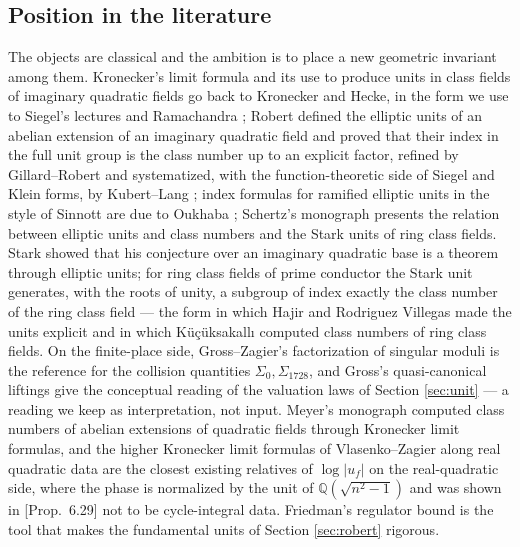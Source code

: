 \documentclass[11pt]{amsart}
\numberwithin{equation}{section}
\theoremstyle{plain}
\theoremstyle{definition}
\theoremstyle{remark}
\newcommand{\Q}{\mathbb{Q}}
\newcommand{\PaperI}{\cite{SchmidtI}}
\begin{document}
\subsection*{Position in the literature}
The objects are classical and the ambition is to place a new geometric
invariant among them.  Kronecker's limit formula and its use to produce
units in class fields of imaginary quadratic fields go back to Kronecker
and Hecke, in the form we use to Siegel's lectures \cite{Siegel1961} and
Ramachandra \cite{Ramachandra1964}; Robert \cite{Robert1973} defined the
elliptic units of an abelian extension of an imaginary quadratic field and
proved that their index in the full unit group is the class number up to
an explicit factor, refined by Gillard--Robert \cite{GillardRobert1979}
and systematized, with the function-theoretic side of Siegel and Klein
forms, by Kubert--Lang \cite[Ch.~11--13]{KubertLang1981}; index formulas
for ramified elliptic units in the style of Sinnott are due to Oukhaba
\cite{Oukhaba2003}; Schertz's monograph \cite[Ch.~6--7]{Schertz2010}
presents the relation between elliptic units and class numbers and the
Stark units of ring class fields.  Stark \cite{Stark1980} showed that his
conjecture over an imaginary quadratic base is a theorem through
elliptic units; for ring class fields of prime conductor the Stark unit
generates, with the roots of unity, a subgroup of index exactly the class
number of the ring class field --- the form in which Hajir and
Rodriguez Villegas \cite{HajirVillegas1997} made the units explicit and in
which K\"u\c{c}\"uksakall{\i} \cite{Kucuksakalli2012} computed class numbers
of ring class fields.  On the finite-place side, Gross--Zagier's
factorization of singular moduli \cite{GrossZagier1985} is the reference
for the collision quantities $\Sigma_0, \Sigma_{1728}$, and Gross's
quasi-canonical liftings \cite{Gross1986} give the conceptual reading of
the valuation laws of Section \ref{sec:unit} --- a reading we keep as
interpretation, not input.  Meyer's monograph \cite{Meyer1957} computed
class numbers of abelian extensions of quadratic fields through Kronecker
limit formulas, and the higher Kronecker limit formulas of Vlasenko--Zagier
\cite{VlasenkoZagier2013} along real quadratic data are the closest
existing relatives of $\log|u_f|$ on the real-quadratic side, where the
phase is normalized by the unit of $\Q(\sqrt{n^2-1})$ and was shown in
\PaperI[Prop.~6.29] not to be cycle-integral data.  Friedman's regulator
bound \cite{Friedman1989} is the tool that makes the fundamental units of
Section \ref{sec:robert} rigorous.
\end{document}
